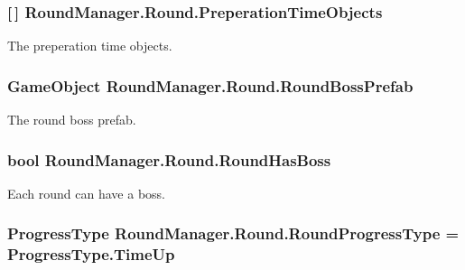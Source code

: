 \subsubsection[{Preperation\+Time\+Objects}]{ \mbox{[}$\,$\mbox{]} Round\+Manager.\+Round.\+Preperation\+Time\+Objects}\label{class_round_manager_1_1_round_a1e58477543ce08f5fd2a436ebadbcc7c}


The preperation time objects. 

\hypertarget{class_round_manager_1_1_round_aebfe780553ec7d96b138eaf9e703629b}{}
\subsubsection[{Round\+Boss\+Prefab}]{\setlength{\rightskip}{0pt plus 5cm}Game\+Object Round\+Manager.\+Round.\+Round\+Boss\+Prefab}\label{class_round_manager_1_1_round_aebfe780553ec7d96b138eaf9e703629b}


The round boss prefab. 

\hypertarget{class_round_manager_1_1_round_a3e8205a74f196546906314f802f41127}{}
\subsubsection[{Round\+Has\+Boss}]{\setlength{\rightskip}{0pt plus 5cm}bool Round\+Manager.\+Round.\+Round\+Has\+Boss}\label{class_round_manager_1_1_round_a3e8205a74f196546906314f802f41127}


Each round can have a boss. 

\hypertarget{class_round_manager_1_1_round_aabbe6a40e81051469e5ca8eefd18303f}{}
\subsubsection[{Round\+Progress\+Type}]{\setlength{\rightskip}{0pt plus 5cm}Progress\+Type Round\+Manager.\+Round.\+Round\+Progress\+Type = Progress\+Type.\+Time\+Up}\label{class_round_manager_1_1_round_aabbe6a40e81051469e5ca8eefd18303f}


